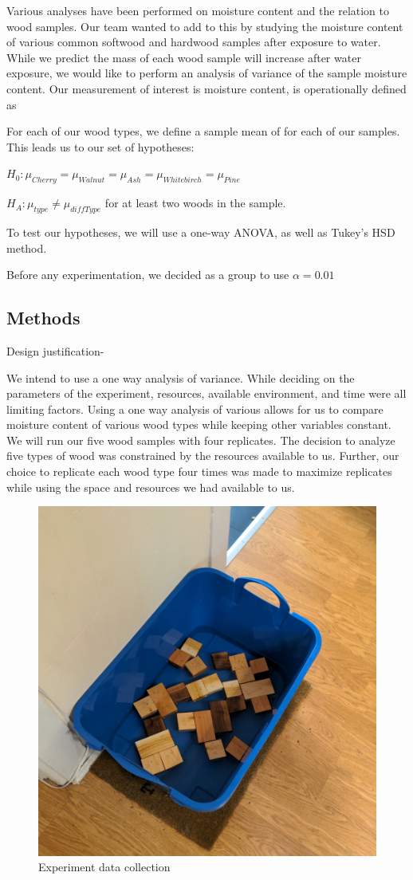 \documentclass[
]{article}
\begin{document}
Various analyses have been performed on moisture content and the
relation to wood samples. Our team wanted to add to this by studying the
moisture content of various common softwood and hardwood samples after
exposure to water. While we predict the mass of each wood sample will
increase after water exposure, we would like to perform an analysis of
variance of the sample moisture content. Our measurement of interest is
moisture content, is operationally defined as

For each of our wood types, we define a sample mean of for each of our
samples. This leads us to our set of hypotheses:

\(H_0: \mu_{Cherry} = \mu_{Walnut} = \mu_{Ash} = \mu_{Whitebirch} = \mu_{Pine}\)

\(H_A: \mu_{type} \ne \mu_{diffType}\) for at least two woods in the
sample.

To test our hypotheses, we will use a one-way ANOVA, as well as Tukey's
HSD method.

Before any experimentation, we decided as a group to use
\(\alpha = 0.01\)

\hypertarget{methods}{%
\subsection{Methods}\label{methods}}

Design justification-

We intend to use a one way analysis of variance. While deciding on the
parameters of the experiment, resources, available environment, and time
were all limiting factors. Using a one way analysis of various allows
for us to compare moisture content of various wood types while keeping
other variables constant. We will run our five wood samples with four
replicates. The decision to analyze five types of wood was constrained
by the resources available to us. Further, our choice to replicate each
wood type four times was made to maximize replicates while using the
space and resources we had available to us.

\begin{figure}

{\centering \includegraphics[width=0.5\linewidth]{wood_samples} 

}

\caption{Experiment data collection}\label{fig:unnamed-chunk-2}
\end{figure}
\end{document}

